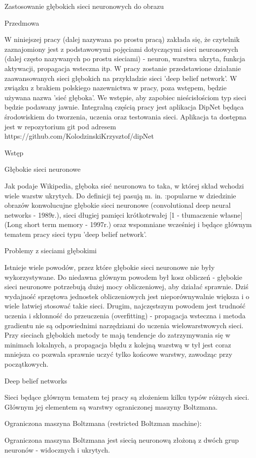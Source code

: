 Zastosowanie głębokich sieci neuronowych do obrazu


Przedmowa

W niniejszej pracy (dalej nazywana po prostu pracą) zakłada się, że czytelnik zaznajomiony jest z podstawowymi pojęciami dotyczącymi sieci neuronowych (dalej często nazywanych po prostu sieciami) - neuron, warstwa ukryta, funkcja aktywacji, propagacja wsteczna itp. W pracy zostanie przedstawione działanie zaawansowanych sieci głębokich na przykładzie sieci 'deep belief network'. W związku z brakiem polskiego nazewnictwa w pracy, poza wstępem, będzie używana nazwa 'sieć głęboka'. We wstępie, aby zapobiec nieścisłościom typ sieci będzie podawany jawnie.
Integralną częścią pracy jest aplikacja DipNet będąca środowiskiem do tworzenia, uczenia oraz testowania sieci. Aplikacja ta dostępna jest w repozytorium git pod adresem https://github.com/KolodzinskiKrzysztof/dipNet

Wstęp

Głębokie sieci neuronowe

Jak podaje Wikipedia, głęboka sieć neuronowa to taka, w której skład wchodzi wiele warstw ukrytych. Do definicji tej pasują m. in. :popularne w dziedzinie obrazów konwolucujne głębokie sieci neuronowe (convolutional deep neural networks - 1989r.), sieci długiej pamięci krótkotrwałej [1 - tłumaczenie własne] (Long short term memory - 1997r.) oraz wspomniane wcześniej i będące głównym tematem pracy sieci typu 'deep belief network'.

Problemy z sieciami głębokimi

Istnieje wiele powodów, przez które głębokie sieci neuronowe nie były wykorzystywane. Do niedawna głównym powodem był kosz obliczeń - głębokie sieci neuronowe potrzebują dużej mocy obliczeniowej, aby działać sprawnie. Dziś wydajność sprzętowa jednostek obliczeniowych jest nieporównywalnie większa i o wiele łatwiej stosować takie sieci.
Drugim, najczęstszym powodem jest trudność uczenia i skłonność do przeuczenia (overfitting) - propagacja wsteczna i metoda gradientu nie są odpowiednimi narzędziami do uczenia wielowarstwowych sieci. Przy sieciach głębokich metody te mają tendencje do zatrzymywania się w minimach lokalnych, a propagacja błędu z kolejną warstwą w tył jest coraz mniejsza co pozwala sprawnie uczyć tylko końcowe warstwy, zawodząc przy początkowych.

Deep belief networks

Sieci będące głównym tematem tej pracy są złożeniem kilku typów różnych sieci. Głównym jej elementem są warstwy ograniczonej maszyny Boltzmana.

Ograniczona maszyna Boltzmana (restricted Boltzman machine):

Ograniczona maszyna Boltzmana jest siecią neuronową złożoną z dwóch grup neuronów - widocznych i ukrytych. 
